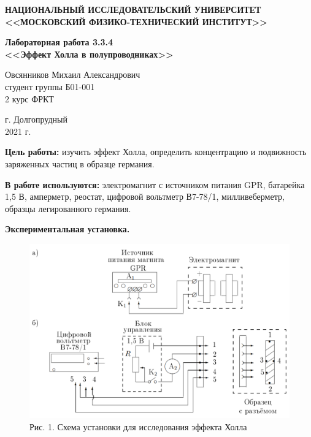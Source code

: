 \documentclass[a4paper,12pt]{article} %
\begin{document}
	\begin{center}
		
		\textbf{НАЦИОНАЛЬНЫЙ ИССЛЕДОВАТЕЛЬСКИЙ УНИВЕРСИТЕТ \\ <<МОСКОВСКИЙ ФИЗИКО-ТЕХНИЧЕСКИЙ ИНСТИТУТ>>}
		\vspace{13ex}
		
		\textbf{Лабораторная работа 3.3.4 \\ <<Эффект Холла в полупроводниках>> }
		\vspace{60ex}
		
		\normalsize{Овсянников Михаил Александрович \\ студент группы Б01-001\\ 2 курс ФРКТ\\}
	\end{center}
	
	\vfill 
	
	\begin{center}
		г. Долгопрудный\\ 
		2021 г.
	\end{center}
	
	\thispagestyle{empty} %
	
	\newpage
	
\textbf{Цель работы:} изучить эффект Холла, определить концентрацию и подвижность заряженных частиц в образце германия.

\vspace{5mm}
\textbf{В работе используются:} электромагнит с источником питания GPR, батарейка 1,5 В, амперметр, реостат, цифровой вольтметр В7-78/1, милливеберметр, образцы легированного германия.

\vspace{7mm}
\textbf{Экспериментальная установка.} 

\begin{figure}[h!]
	\centering
	\includegraphics[scale=0.7]{Pictures/Установка.png}
	\caption*{Рис. 1. Схема установки для исследования эффекта Холла}
\end{figure}
\end{document}
